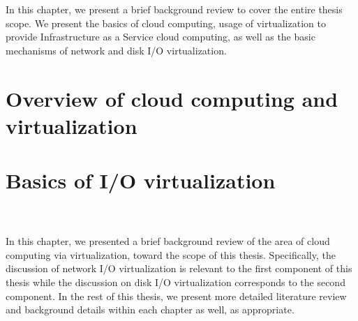 
In this chapter, we present a brief background review to cover 
the entire thesis scope. We present the basics of cloud computing, 
usage of virtualization to provide Infrastructure as a Service cloud
computing, as well as the basic mechanisms of network and disk
I/O virtualization. 

\section{Overview of cloud computing and virtualization}
\label{sec:litreviewchap-cloud-virt}


\section{Basics of I/O virtualization}
\label{sec:litreviewchap-io-virtualization}

\\
\\
In this chapter, we presented a brief background review of the area of
cloud computing via virtualization, toward the scope of this thesis.
Specifically, the discussion of network 
I/O virtualization is relevant
to the first component of this thesis 
while the discussion on disk I/O virtualization corresponds to 
the second component.
In the rest of this thesis, we present more detailed literature review 
and background details within each chapter as well, as appropriate.

